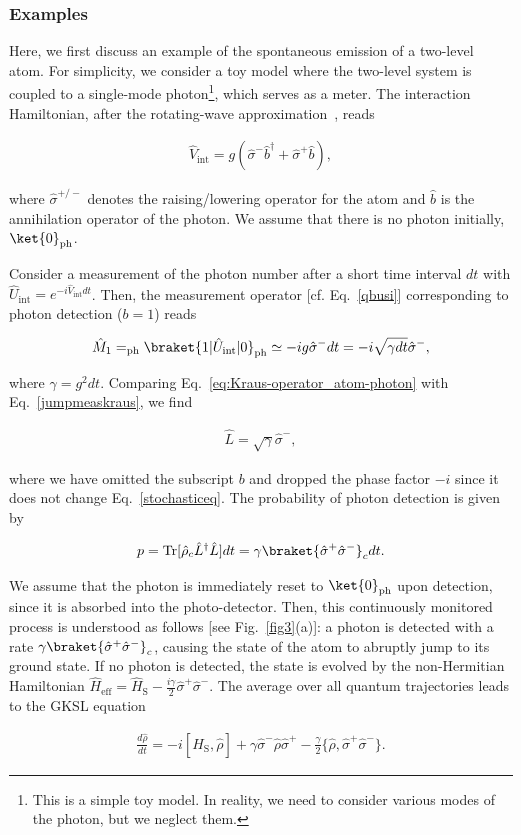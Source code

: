 \documentclass[preprint,pteplogo]{ptephy_v2}%
\numberwithin{equation}{section}
\theoremstyle{definition}
\newcommand{\mr}[1]{\mathrm{#1}}
\newcommand{\aln}[1]{
\begin{align}
#1
\end{align}
}
\begin{document}
\subsubsection{Examples}\label{qtex}
Here, we first discuss an example of the spontaneous emission of a two-level atom.
For simplicity, we consider a toy model where the two-level system is coupled to a single-mode photon\footnote{
This is a simple toy model. 
In reality, we need to consider various modes of the photon, but we neglect them.
}, which serves as a meter.
The interaction Hamiltonian, after the rotating-wave approximation~\cite{shore1993jaynes}, reads
\aln{
\hat{V}_\mr{int}= g(\hat{\sigma}^-\hat{b}^\dag+\hat{\sigma}^+\hat{b}),
}
where $\hat{\sigma}^{+/-}$ denotes the raising/lowering operator for the atom and $\hat{b}$ is the annihilation operator of the photon.
We assume that there is no photon initially, $\ket{0}_\mr{ph}$.

Consider a measurement of the photon number after a short time interval $dt$ with $\hat{U}_\mathrm{int}=e^{-i\hat{V}_\mathrm{int}dt}$.
Then, the measurement operator [cf. Eq.~\eqref{qbusi}] corresponding to photon detection ($b=1$) reads
\aln{\label{eq:Kraus-operator_atom-photon}
\hat{M}_1=_\mr{ph}\braket{1|\hat{U}_\mr{int}|0}_\mr{ph}\simeq{-i} g\hat{\sigma}^-dt={-i}\sqrt{\gamma dt}\hat{\sigma}^-,
}
where $\gamma=g^2dt$.
Comparing Eq.~\eqref{eq:Kraus-operator_atom-photon} with Eq.~\eqref{jumpmeaskraus}, we find
\aln{\label{singlejump}
\hat{L}=\sqrt{\gamma}\hat{\sigma}^-,
}
where we have omitted the subscript $b$ and dropped the phase factor $-i$ since it does not change Eq.~\eqref{stochasticeq}.
The probability of photon detection is given by
\aln{
p=\mr{Tr}[\hat{\rho}_c\hat{L}^\dag\hat{L}]dt=\gamma\braket{\hat{\sigma}^+\hat{\sigma}^-}_cdt.
}
We assume that the photon is immediately reset to $\ket{0}_\mr{ph}$ upon detection, since it is absorbed into the photo-detector.
Then, this continuously monitored process is understood as follows [see Fig.~\ref{fig3}(a)]:
a photon is detected with a rate $\gamma\braket{\hat{\sigma}^+\hat{\sigma}^-}_c$, causing the state of the atom to abruptly jump to its ground state.
If no photon is detected, the state is evolved by the non-Hermitian Hamiltonian $\hat{H}_\mr{eff}=\hat{H}_\mr{S}-\frac{i\gamma}{2}\hat{\sigma}^+\hat{\sigma}^-$.
The average over all quantum trajectories leads to the GKSL equation
\aln{
\frac{d\hat{\rho}}{dt}=-i[\hat{H}_\mr{S},\hat{\rho}]+\gamma\hat{\sigma}^-\hat{\rho}\hat{\sigma}^+-\frac{\gamma}{2}\{\hat{\rho},\hat{\sigma}^+\hat{\sigma}^-\}.
}
\end{document}
